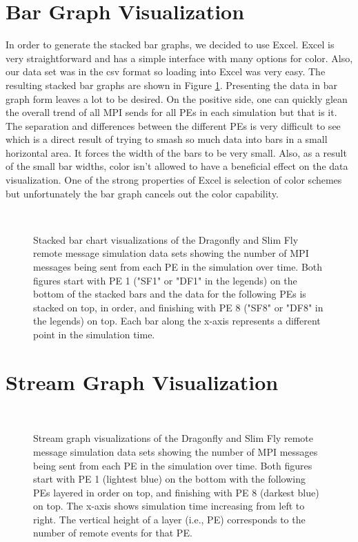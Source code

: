 \documentclass[12pt]{article}
\begin{document}
\section{Bar Graph Visualization} \label{bar}
In order to generate the stacked bar graphs, we decided to use Excel. Excel is very straightforward and has a simple interface with many options for color. Also, our data set was in the csv format so loading into Excel was very easy. The resulting stacked bar graphs are shown in Figure \ref{Bar}. Presenting the data in bar graph form leaves a lot to be desired. On the positive side, one can quickly glean the overall trend of all MPI sends for all PEs in each simulation but that is it. The separation and differences between the different PEs is very difficult to see which is a direct result of trying to smash so much data into bars in a small horizontal area. It forces the width of the bars to be very small. Also, as a result of the small bar widths, color isn't allowed to have a beneficial effect on the data visualization. One of the strong properties of Excel is selection of color schemes but unfortunately the bar graph cancels out the color capability.
\begin{figure}[!ht]
     \centering
     \\
     \caption{Stacked bar chart visualizations of the Dragonfly and Slim Fly remote message simulation data sets showing the number of MPI messages being sent from each PE in the simulation over time. Both figures start with PE 1 ("SF1" or "DF1" in the legends) on the bottom of the stacked bars and the data for the following PEs is stacked on top, in order, and finishing with PE 8 ("SF8" or "DF8" in the legends) on top. Each bar along the x-axis represents a different point in the simulation time.}
     \label{Bar}
\end{figure}

\section{Stream Graph Visualization} \label{stream}

\begin{figure}[!ht]
     \centering
     \\
     \caption{Stream graph visualizations of the Dragonfly and Slim Fly remote message simulation data sets showing the number of MPI messages being sent from each PE in the simulation over time. Both figures start with PE 1 (lightest blue) on the bottom with the following PEs layered in order on top, and finishing with PE 8 (darkest blue) on top. The x-axis shows simulation time increasing from left to right.  The vertical height of a layer (i.e., PE) corresponds to the number of remote events for that PE.}
     \label{sg}
\end{figure}
\end{document}
